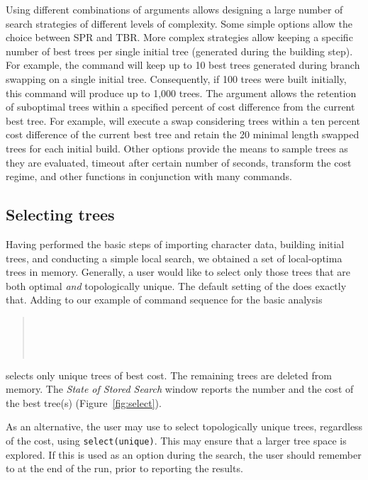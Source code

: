 {Using different combinations of  arguments allows designing a  large number of search 
strategies of different levels of complexity. Some simple options allow the choice between SPR and TBR. More 
complex strategies allow keeping a specific number of best trees per single initial tree (generated during the building step). 
For example, the command  will keep up to 10 best trees generated during branch swapping 
on a single initial tree. Consequently, if 100 trees were built initially, this command will produce up to 1,000 trees. The 
argument  allows the retention of suboptimal trees within a specified percent of cost difference 
from the current best tree. For example,  will execute a swap considering 
trees within a ten percent cost difference of the current best tree and retain the 20 minimal length swapped trees for each 
initial build. Other options provide the means to sample trees as they are evaluated, timeout after certain number of seconds, 
transform the cost regime, and other functions in conjunction with many \poy commands.

\subsection{Selecting trees}

Having performed the basic steps of importing character data, building initial trees, and conducting a simple local search, 
we obtained a set of local-optima trees in memory. Generally, a user would like to select only those trees that are 
both optimal \emph{and} topologically unique. The default setting of the  does exactly that. 
Adding  to our example of command sequence for the basic analysis 
\begin{quote}
 	\\
 	\\
	\\
\end{quote}
selects only unique trees of best cost. The remaining trees are deleted from memory. The \emph{State of Stored Search} 
window reports the number and the cost of the best tree(s) (Figure~\ref{fig:select}).

As an alternative, the user may use to select topologically unique trees, regardless of the cost, using 
\texttt{select(unique)}.  This may ensure that a larger tree space is explored.  If this is used as an option during the 
search, the user should remember to   at the end of the run, prior to reporting the results.

}
